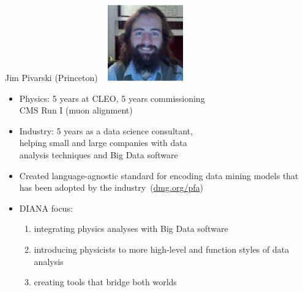 \documentclass{beamer}
\begin{document}
\begin{frame}{Jim Pivarski (Princeton)}
\mbox{ } \hfill \includegraphics[height=2 cm]{jim_pivarski.png}

\vspace{-2 cm}
\begin{itemize}
\item Physics: 5 years at CLEO, 5 years commissioning \\ CMS Run I (muon alignment)
\item Industry: 5 years as a data science consultant, \\ helping small and large companies with data \\ analysis techniques and Big Data software
\item Created language-agnostic standard for encoding data mining models that has been adopted by the \mbox{industry (\textcolor{blue}{\small \url{dmg.org/pfa}})\hspace{-1 cm}}
\item DIANA focus:
\begin{enumerate}
\item integrating physics analyses with Big Data software
\item introducing physicists to more high-level and function styles of data analysis
\item creating tools that bridge both worlds
\end{enumerate}
\end{itemize}
\end{frame}
\end{document}
